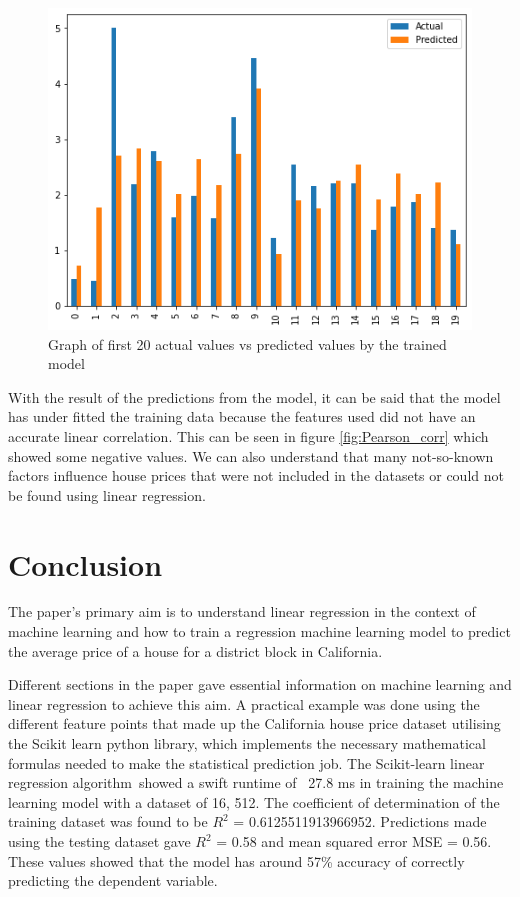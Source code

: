 \documentclass[conference]{IEEEtran}
\begin{document}
\begin{figure}[htbp]
	\centerline{\includegraphics [scale=0.5]{figures/actual_vs_predicted.png}}
	\caption{Graph of first 20 actual values vs predicted values by the trained model}
	\label{fig:actual_vs_predicted}
\end{figure}

With the result of the predictions from the model, it can be said that the model has under fitted the training data because the features used did not have an accurate linear correlation. This can be seen in figure \ref{fig:Pearson_corr} which showed some negative values. We can also understand that many not-so-known factors influence house prices that were not included in the datasets or could not be found using linear regression.


\section{Conclusion}
The paper's primary aim is to understand linear regression in the context of machine learning and how to train a regression machine learning model to predict the average price of a house for a district block in California.

Different sections in the paper gave essential information on machine learning and linear regression to achieve this aim. A practical example was done using the different feature points that made up the California house price dataset utilising the Scikit learn python library, which implements the necessary mathematical formulas needed to make the statistical prediction job. The Scikit-learn linear regression algorithm showed a swift runtime of  27.8 ms in training the machine learning model with a dataset of 16, 512. The coefficient of determination of the training dataset was found to be $R^2$ = 0.6125511913966952. Predictions made using the testing dataset gave $R^2$ = 0.58 and mean squared error MSE = 0.56. These values showed that the model has around 57\% accuracy of correctly predicting the dependent variable.
\end{document}
